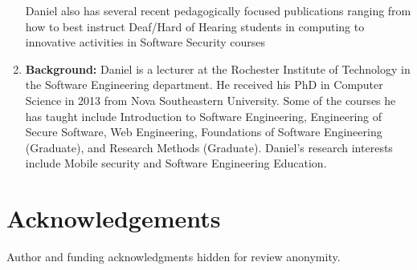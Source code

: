 \documentclass[titlepage]{article}
\newif\ifisnopii
\begin{document}
\begin{enumerate}
\begin{enumerate}
	
	\end{enumerate}
	
		
	Daniel also has several recent pedagogically focused publications ranging from how to best instruct Deaf/Hard of Hearing students in computing to innovative activities in Software Security courses~\cite{krutz2013teaching,krutz2014using, krutz2015enhancing,malachowsky2015project,krutz2015insider,krutz2013experiencing,lutz2012instilling,krutz2013bug}
	
	\item \textbf{Background:}  Daniel is a lecturer at the Rochester Institute of Technology in the Software Engineering department. He received his PhD in Computer Science in 2013 from Nova Southeastern University. Some of the courses he has taught include Introduction to Software Engineering, Engineering of Secure Software, Web Engineering, Foundations of Software Engineering (Graduate), and Research Methods (Graduate). Daniel's research interests include Mobile security and Software Engineering Education.



\end{enumerate}



\section*{Acknowledgements}
\ifisnopii %
This work is partially sponsored by a SIGCSE Special Projects Grant. %

\else %
Author and funding acknowledgments hidden for review anonymity.
\fi %






\end{document}
